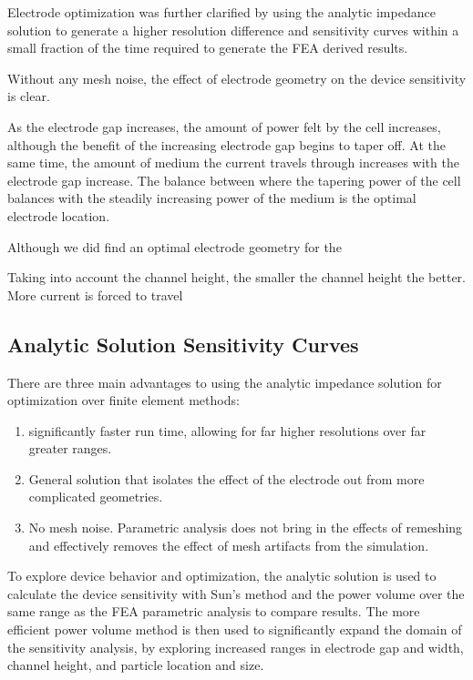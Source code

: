 \par Electrode optimization was further clarified by using the analytic impedance solution to generate a higher resolution difference and sensitivity curves within a small fraction of the time required to generate the FEA derived results. 

\par Without any mesh noise, the effect of electrode geometry on the device sensitivity is clear. 

\par As the electrode gap increases, the amount of power felt by the cell increases, although the benefit of the increasing electrode gap begins to taper off. At the same time, the amount of medium the current travels through increases with the electrode gap increase. The balance between where the tapering power of the cell balances with the steadily increasing power of the medium is the optimal electrode location.

\par Although we did find an optimal electrode geometry for the 

\par Taking into account the channel height, the smaller the channel height the better. More current is forced to travel 

\FloatBarrier

\subsection{Analytic Solution Sensitivity Curves}

\par There are three main advantages to using the analytic impedance solution for optimization over finite element methods:

\begin{enumerate}
	\item significantly faster run time, allowing for far higher resolutions over far greater ranges.
	\item General solution that isolates the effect of the electrode out from more complicated geometries.
	\item No mesh noise. Parametric analysis does not bring in the effects of remeshing and effectively removes the effect of mesh artifacts from the simulation.
\end{enumerate}

\par To explore device behavior and optimization, the analytic solution is used to calculate the device sensitivity with Sun's method and the power volume over the same range as the FEA parametric analysis to compare results. The more efficient power volume method is then used to significantly expand the domain of the sensitivity analysis, by exploring increased ranges in electrode gap and width, channel height, and particle location and size. 

